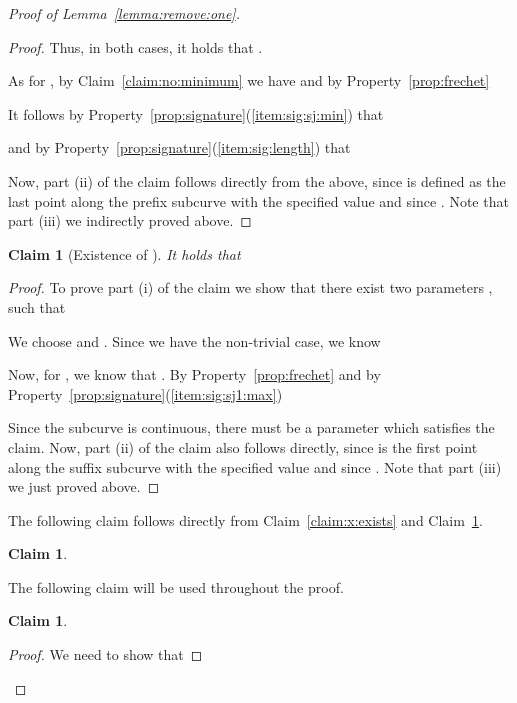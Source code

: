 \documentclass[11pt, letter]{article}
\newtheorem{claim}[theorem]{Claim}
\newcommand{\lemref}[1]{Lemma~\ref{lemma:#1}}
\newcommand{\claimlab}[1]{\label{claim:#1}}
\newcommand{\claimref}[1]{Claim~\ref{claim:#1}}
\newcommand{\propref}[1]{Property~\ref{prop:#1}}
\begin{document}
\begin{proof}[Proof of \lemref{remove:one}]
\begin{proof}
Thus, in both cases, it holds that 
.

As for , by \claimref{no:minimum} we have  and 
by \propref{frechet} 

It follows by \propref{signature}(\ref{item:sig:sj:min}) that 

and by \propref{signature}(\ref{item:sig:length}) that 

Now, part (ii) of the claim follows directly from the above,
since  is defined as the last point along the prefix subcurve 
 with the specified value and since .
Note that part (iii) we indirectly proved above. 
\end{proof}


\begin{claim}[Existence of ] It holds that
\begin{compactenum}[(i)]
\item 
\item 
\item 
\end{compactenum}
\claimlab{y:exists}
\claimlab{sj1:high}
\end{claim}
\begin{proof}
To prove part (i) of the claim we show that there exist two parameters
,
such that 

We choose  and .
Since we have the non-trivial case, we know 

Now, for , we know that .
By \propref{frechet} and by \propref{signature}(\ref{item:sig:sj1:max})
 
Since the subcurve is continuous, there must be a parameter  which satisfies the claim.
Now, part (ii) of the claim also follows directly, since  is the first point along the suffix subcurve
 with the specified value and since .
Note that part (iii) we just proved above.
\end{proof}

The following claim follows directly from \claimref{x:exists} and \claimref{y:exists}.
\begin{claim}

\claimlab{xy:inside}
\end{claim}

The following claim will be used throughout the proof.
\begin{claim} 

\claimlab{not:so:bad}
\claimlab{max:dist}
\end{claim}

\begin{proof}
We need to show that 


\end{proof}
\end{proof}
\end{document}
